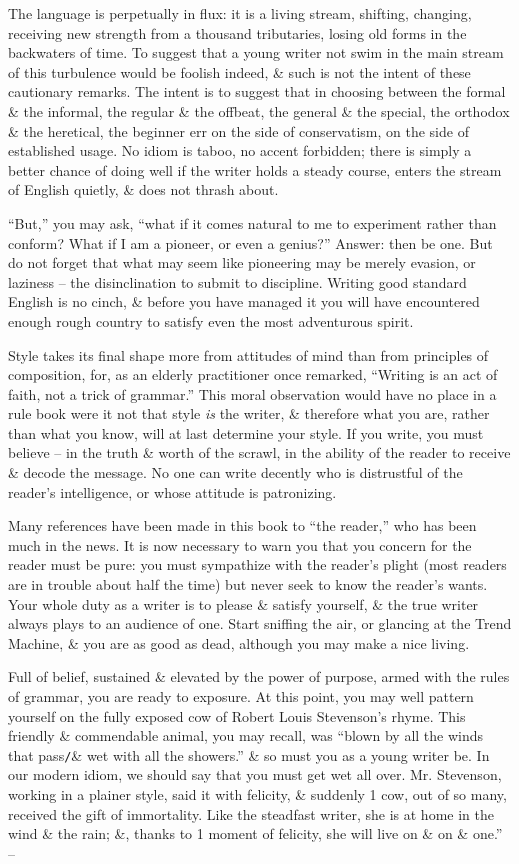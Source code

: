 \documentclass{article}
\numberwithin{equation}{section}
\begin{document}
The language is perpetually in flux: it is a living stream, shifting, changing, receiving new strength from a thousand tributaries, losing old forms in the backwaters of time. To suggest that a young writer not swim in the main stream of this turbulence would be foolish indeed, \& such is not the intent of these cautionary remarks. The intent is to suggest that in choosing between the formal \& the informal, the regular \& the offbeat, the general \& the special, the orthodox \& the heretical, the beginner err on the side of conservatism, on the side of established usage. No idiom is taboo, no accent forbidden; there is simply a better chance of doing well if the writer holds a steady course, enters the stream of English quietly, \& does not thrash about.

``But,'' you may ask, ``what if it comes natural to me to experiment rather than conform? What if I am a pioneer, or even a genius?'' Answer: then be one. But do not forget that what may seem like pioneering may be merely evasion, or laziness -- the disinclination to submit to discipline. Writing good standard English is no cinch, \& before you have managed it you will have encountered enough rough country to satisfy even the most adventurous spirit.

Style takes its final shape more from attitudes of mind than from principles of composition, for, as an elderly practitioner once remarked, ``Writing is an act of faith, not a trick of grammar.'' This moral observation would have no place in a rule book were it not that style \textit{is} the writer, \& therefore what you are, rather than what you know, will at last determine your style. If you write, you must believe -- in the truth \& worth of the scrawl, in the ability of the reader to receive \& decode the message. No one can write decently who is distrustful of the reader's intelligence, or whose attitude is patronizing.

Many references have been made in this book to ``the reader,'' who has been much in the news. It is now necessary to warn you that you concern for the reader must be pure: you must sympathize with the reader's plight (most readers are in trouble about half the time) but never seek to know the reader's wants. Your whole duty as a writer is to please \& satisfy yourself, \& the true writer always plays to an audience of one. Start sniffing the air, or glancing at the Trend Machine, \& you are as good as dead, although you may make a nice living.

Full of belief, sustained \& elevated by the power of purpose, armed with the rules of grammar, you are ready to exposure. At this point, you may well pattern yourself on the fully exposed cow of Robert Louis Stevenson's rhyme. This friendly \& commendable animal, you may recall, was ``blown by all the winds that pass\texttt{/}\& wet with all the showers.'' \& so must you as a young writer be. In our modern idiom, we should say that you must get wet all over. Mr. Stevenson, working in a plainer style, said it with felicity, \& suddenly 1 cow, out of so many, received the gift of immortality. Like the steadfast writer, she is at home in the wind \& the rain; \&, thanks to 1 moment of felicity, she will live on \& on \& one.'' -- \cite[pp. 101--103]{Strunk_White2019}
\end{document}
